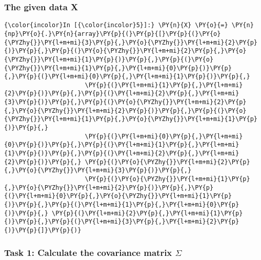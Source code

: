     \hypertarget{the-given-data-x}{%
\subsubsection{The given data X}\label{the-given-data-x}}

    \begin{Verbatim}[commandchars=\\\{\}]
{\color{incolor}In [{\color{incolor}5}]:} \PY{n}{X} \PY{o}{=} \PY{n}{np}\PY{o}{.}\PY{n}{array}\PY{p}{(}\PY{p}{[}\PY{p}{(}\PY{o}{\PYZhy{}}\PY{l+m+mi}{3}\PY{p}{,}\PY{o}{\PYZhy{}}\PY{l+m+mi}{2}\PY{p}{)}\PY{p}{,}\PY{p}{(}\PY{o}{\PYZhy{}}\PY{l+m+mi}{2}\PY{p}{,}\PY{o}{\PYZhy{}}\PY{l+m+mi}{1}\PY{p}{)}\PY{p}{,}\PY{p}{(}\PY{o}{\PYZhy{}}\PY{l+m+mi}{1}\PY{p}{,}\PY{l+m+mi}{0}\PY{p}{)}\PY{p}{,}\PY{p}{(}\PY{l+m+mi}{0}\PY{p}{,}\PY{l+m+mi}{1}\PY{p}{)}\PY{p}{,}
                      \PY{p}{(}\PY{l+m+mi}{1}\PY{p}{,}\PY{l+m+mi}{2}\PY{p}{)}\PY{p}{,}\PY{p}{(}\PY{l+m+mi}{2}\PY{p}{,}\PY{l+m+mi}{3}\PY{p}{)}\PY{p}{,}\PY{p}{(}\PY{o}{\PYZhy{}}\PY{l+m+mi}{2}\PY{p}{,}\PY{o}{\PYZhy{}}\PY{l+m+mi}{2}\PY{p}{)}\PY{p}{,}\PY{p}{(}\PY{o}{\PYZhy{}}\PY{l+m+mi}{1}\PY{p}{,}\PY{o}{\PYZhy{}}\PY{l+m+mi}{1}\PY{p}{)}\PY{p}{,}
                      \PY{p}{(}\PY{l+m+mi}{0}\PY{p}{,}\PY{l+m+mi}{0}\PY{p}{)}\PY{p}{,}\PY{p}{(}\PY{l+m+mi}{1}\PY{p}{,}\PY{l+m+mi}{1}\PY{p}{)}\PY{p}{,}\PY{p}{(}\PY{l+m+mi}{2}\PY{p}{,}\PY{l+m+mi}{2}\PY{p}{)}\PY{p}{,} \PY{p}{(}\PY{o}{\PYZhy{}}\PY{l+m+mi}{2}\PY{p}{,}\PY{o}{\PYZhy{}}\PY{l+m+mi}{3}\PY{p}{)}\PY{p}{,}
                      \PY{p}{(}\PY{o}{\PYZhy{}}\PY{l+m+mi}{1}\PY{p}{,}\PY{o}{\PYZhy{}}\PY{l+m+mi}{2}\PY{p}{)}\PY{p}{,}\PY{p}{(}\PY{l+m+mi}{0}\PY{p}{,}\PY{o}{\PYZhy{}}\PY{l+m+mi}{1}\PY{p}{)}\PY{p}{,}\PY{p}{(}\PY{l+m+mi}{1}\PY{p}{,}\PY{l+m+mi}{0}\PY{p}{)}\PY{p}{,} \PY{p}{(}\PY{l+m+mi}{2}\PY{p}{,}\PY{l+m+mi}{1}\PY{p}{)}\PY{p}{,}\PY{p}{(}\PY{l+m+mi}{3}\PY{p}{,}\PY{l+m+mi}{2}\PY{p}{)}\PY{p}{]}\PY{p}{)}
\end{Verbatim}

    \hypertarget{task-1-calculate-the-covariance-matrix-sigma}{%
\subsubsection{\texorpdfstring{Task 1: Calculate the covariance matrix
\(\Sigma\)}{Task 1: Calculate the covariance matrix \textbackslash{}Sigma}}\label{task-1-calculate-the-covariance-matrix-sigma}}

